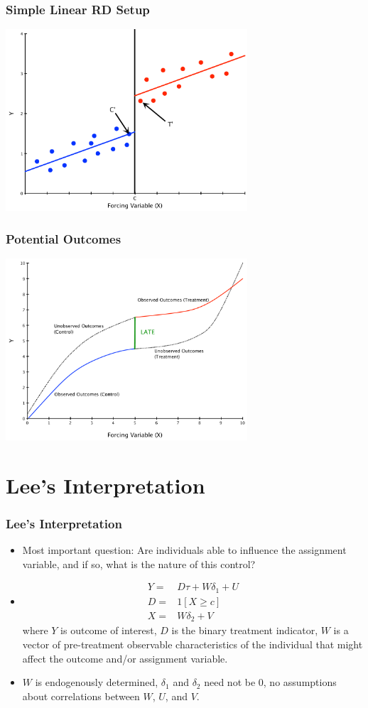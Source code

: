 \documentclass{beamer}
\begin{document}
\begin{frame}
  \frametitle{Simple Linear RD Setup}
\includegraphics[width=9cm]{linear_reg_discont.pdf}  
\end{frame}


\begin{frame}
  \frametitle{Potential Outcomes}
\includegraphics[width=9cm]{RD_potential_outcomes.pdf}  
\end{frame}

\section{Lee's Interpretation} %
\label{sec:lee_s_interpretation}

\begin{frame}[c]\frametitle{Lee's Interpretation}
	\begin{itemize}
		\item<+-> Most important question: Are individuals able to influence the assignment variable, and if so, what is the nature of this control?
		\item<+-> 
		\begin{align*}
			Y =& D\tau + W\delta_1 + U\\
			D =&1[X\geq c] \\
			X =&W\delta_2 + V
		\end{align*}
		where $Y$ is outcome of interest, $D$ is the binary treatment indicator, $W$ is a vector of pre-treatment observable characteristics of the individual that might affect the outcome and/or assignment variable.
		\item<+-> $W$ is endogenously determined, $\delta_1$ and $\delta_2$ need not be 0, no assumptions about correlations between $W$, $U$, and $V$.
	\end{itemize}
\end{frame}
\end{document}
